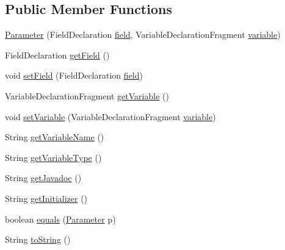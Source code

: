 \subsection*{Public Member Functions}
\begin{DoxyCompactItemize}
\item 
\hyperlink{classit_1_1isislab_1_1masonhelperdocumentation_1_1analizer_1_1_parameter_af9f0662b9421f6b21f437b277bda68c8}{Parameter} (Field\-Declaration \hyperlink{classit_1_1isislab_1_1masonhelperdocumentation_1_1analizer_1_1_parameter_a4ef3d7c5ebfef1eaa4de0c29576511de}{field}, Variable\-Declaration\-Fragment \hyperlink{classit_1_1isislab_1_1masonhelperdocumentation_1_1analizer_1_1_parameter_a34712a73715b651bb3dd284cbf1dd1c6}{variable})
\item 
Field\-Declaration \hyperlink{classit_1_1isislab_1_1masonhelperdocumentation_1_1analizer_1_1_parameter_af2e03466b6f3886cc4102c32e381f71d}{get\-Field} ()
\item 
void \hyperlink{classit_1_1isislab_1_1masonhelperdocumentation_1_1analizer_1_1_parameter_a003a4a25b630b9ddc16f02ac6dbf7add}{set\-Field} (Field\-Declaration \hyperlink{classit_1_1isislab_1_1masonhelperdocumentation_1_1analizer_1_1_parameter_a4ef3d7c5ebfef1eaa4de0c29576511de}{field})
\item 
Variable\-Declaration\-Fragment \hyperlink{classit_1_1isislab_1_1masonhelperdocumentation_1_1analizer_1_1_parameter_a9459d9a714599fa60e64ecb0cb7e1749}{get\-Variable} ()
\item 
void \hyperlink{classit_1_1isislab_1_1masonhelperdocumentation_1_1analizer_1_1_parameter_a2f3654f9b6f92b83f141325ed3f5b674}{set\-Variable} (Variable\-Declaration\-Fragment \hyperlink{classit_1_1isislab_1_1masonhelperdocumentation_1_1analizer_1_1_parameter_a34712a73715b651bb3dd284cbf1dd1c6}{variable})
\item 
String \hyperlink{classit_1_1isislab_1_1masonhelperdocumentation_1_1analizer_1_1_parameter_a90a9a8c551b6aa3b5a7502f6598ca4ef}{get\-Variable\-Name} ()
\item 
String \hyperlink{classit_1_1isislab_1_1masonhelperdocumentation_1_1analizer_1_1_parameter_a48031cde1b9d7e114344f3ad8c78fcfc}{get\-Variable\-Type} ()
\item 
String \hyperlink{classit_1_1isislab_1_1masonhelperdocumentation_1_1analizer_1_1_parameter_a928249701d8d6e68ee04ec4ac229dea0}{get\-Javadoc} ()
\item 
String \hyperlink{classit_1_1isislab_1_1masonhelperdocumentation_1_1analizer_1_1_parameter_a07dc63757087b68c16b25da63922c589}{get\-Initializer} ()
\item 
boolean \hyperlink{classit_1_1isislab_1_1masonhelperdocumentation_1_1analizer_1_1_parameter_ab6e1a54620fdc67a19e3b5f080a4fe6e}{equals} (\hyperlink{classit_1_1isislab_1_1masonhelperdocumentation_1_1analizer_1_1_parameter}{Parameter} p)
\item 
String \hyperlink{classit_1_1isislab_1_1masonhelperdocumentation_1_1analizer_1_1_parameter_a160bdfaa76ebdd6345cad2c751ffa834}{to\-String} ()
\end{DoxyCompactItemize}
